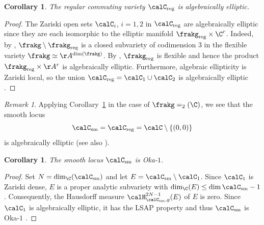\documentclass[12pt, a4paper, oneside]{amsart}
\theoremstyle{plain} %
\newtheorem{corollary}[theorem]{Corollary}
\theoremstyle{definition} %
\theoremstyle{remark} %
\newtheorem{remark}[theorem]{Remark}
\begin{document}
\begin{corollary}\label{cor:algellipticity}
The regular commuting variety $\calC_{\rm reg}$ is algebraically elliptic.
\end{corollary}

\begin{proof}
The Zariski open sets $\calC_i$, $i=1,2$ in $\calC_{\rm reg}$ are algebraically elliptic since they are each isomorphic to the elliptic manifold $\frakg_{\rm reg}\times \C^r$. Indeed, by \cite[Theorem 4.12]{Vel72}, $\frakg\setminus\frakg_{\rm reg}$ is a closed subvariety of codimension $3$ in the flexible variety $\frakg\simeq \AA^{\dim(\frakg)}$. By \cite[Theorem 1.1]{FKZ16}, $\frakg_{\rm reg}$ is flexible and hence the product $\frakg_{\rm reg}\times \AA^r$ is algebraically elliptic. Furthermore, algebraic ellipticity is Zariski local, so the union $\calC_{\rm reg}=\calC_1\cup \calC_2$ is algebraically elliptic \cite[Theorem 0.1]{KZ24}.
\end{proof}

\begin{remark}
Applying Corollary~\ref{cor:algellipticity} in the case of $\frakg=\sl_2(\C)$, we see that the smooth locus
\[\calC_{\rm sm} = \calC_{\rm reg} = \calC\setminus \{(0,0)\}\]
is algebraically elliptic (see also \cite[Example 1.10]{Popov}).
\end{remark}

\begin{corollary}
The smooth locus $\calC_{\rm sm}$ is Oka-$1$.
\end{corollary}
\begin{proof}
Set $N= \dim_\C(\calC_{\rm sm})$ and let $E =\calC_{\rm sm}\setminus \calC_1$. Since $\calC_1$ is Zariski dense, $E$ is a proper analytic subvariety with $\dim_\C(E)\leq \dim \calC_{\rm sm}-1$. Consequently, the Hausdorff measure $\calH^{2N-1}_{\calC_{\rm sm},g}(E)$ of $E$ is zero. Since $\calC_1$ is algebraically elliptic, it has the LSAP property and thus $\calC_{\rm sm}$ is Oka-$1$ \cite[Proposition 7.13 (b)]{AF25}.
\end{proof}
\end{document}
